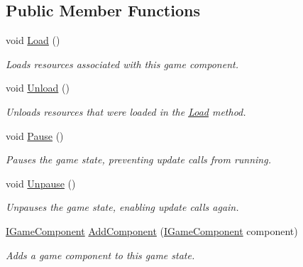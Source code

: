\subsection*{Public Member Functions}
\begin{DoxyCompactItemize}
\item 
void \hyperlink{interface_tri_devs_1_1_tri_engine_1_1_state_management_1_1_i_game_state_a382b9a4617f0b3fa2adc3e4954ba58ff}{Load} ()
\begin{DoxyCompactList}\small\item\em Loads resources associated with this game component. \end{DoxyCompactList}\item 
void \hyperlink{interface_tri_devs_1_1_tri_engine_1_1_state_management_1_1_i_game_state_a68b7b7c44eb3b8b5cd17166bd1069253}{Unload} ()
\begin{DoxyCompactList}\small\item\em Unloads resources that were loaded in the \hyperlink{interface_tri_devs_1_1_tri_engine_1_1_state_management_1_1_i_game_state_a382b9a4617f0b3fa2adc3e4954ba58ff}{Load} method. \end{DoxyCompactList}\item 
void \hyperlink{interface_tri_devs_1_1_tri_engine_1_1_state_management_1_1_i_game_state_a9f790c4d9beed08bf8feab50e4bed3f5}{Pause} ()
\begin{DoxyCompactList}\small\item\em Pauses the game state, preventing update calls from running. \end{DoxyCompactList}\item 
void \hyperlink{interface_tri_devs_1_1_tri_engine_1_1_state_management_1_1_i_game_state_a34fa26de536e16c57360b8baab7db131}{Unpause} ()
\begin{DoxyCompactList}\small\item\em Unpauses the game state, enabling update calls again. \end{DoxyCompactList}\item 
\hyperlink{interface_tri_devs_1_1_tri_engine_1_1_interfaces_1_1_i_game_component}{I\-Game\-Component} \hyperlink{interface_tri_devs_1_1_tri_engine_1_1_state_management_1_1_i_game_state_af914b312a33357971f1d7552cf651776}{Add\-Component} (\hyperlink{interface_tri_devs_1_1_tri_engine_1_1_interfaces_1_1_i_game_component}{I\-Game\-Component} component)
\begin{DoxyCompactList}\small\item\em Adds a game component to this game state. \end{DoxyCompactList}\item 

\end{DoxyCompactItemize}
